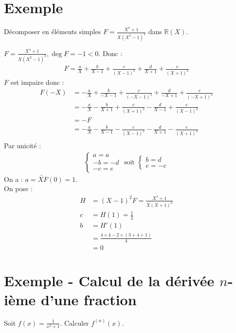 \documentclass[../main.tex]{subfiles}
\begin{document}
\section{Exemple}
\begin{tcolorbox}[title=Exemple 17.47, title filled=false, colframe=darkgreen, colback=darkgreen!10!white]
    Décomposer en éléments simples $F = \frac{X^4 + 1}{X(X^2 - 1)^2}$ dans $\mathbb{R}(X)$. 
\end{tcolorbox}
\noindent $F = \frac{X^4 + 1}{X(X^2 - 1)^2}, \deg F = -1 < 0$. Donc :\\
\begin{align*}
    F = \frac{a}{X} + \frac{b}{X - 1} + \frac{c}{(X - 1)^2} + \frac{d}{X + 1} + \frac{e}{(X + 1)^2}
\end{align*}
$F$ est impaire donc : 
\begin{align*}
    F(-X) &= -\frac{a}{X} + \frac{b}{-X-1} + \frac{c}{(-X - 1)^2} + \frac{d}{-X + 1} + \frac{e}{(-X + 1)^2} \\
    &= -\frac{a}{X} - \frac{b}{X + 1} + \frac{c}{(X + 1)^2} - \frac{d}{X - 1} + \frac{e}{(X - 1)^2} \\
    &= -F \\
    &= -\frac{a}{X} - \frac{b}{X - 1} - \frac{c}{(X - 1)^2} - \frac{d}{X + 1} - \frac{e}{(X + 1)^2} \\
\end{align*}
Par unicité : 
\begin{align*}
    \begin{cases}
        a = a \\
        -b = -d \\
        -c = e
    \end{cases}
    \text{ soit }
    \begin{cases}
        b = d \\
        e = -c
    \end{cases}
\end{align*}
On a : $a = \tilde{XF}(0) = 1$. \\
On pose : 
\begin{align*}
    H &= (X - 1)^2 F = \frac{X^4 + 1}{X(X + 1)^2} \\
    c &= H(1) = \frac{1}{2} \\
    b &= H'(1) \\
    &= \frac{4 \times 4 - 2 \times (3 + 4 + 1)}{4} \\
    &= 0
\end{align*}

\section{Exemple - Calcul de la dérivée $n$-ième d'une fraction}
\begin{tcolorbox}[title=Exemple 17.51, title filled=false, colframe=darkgreen, colback=darkgreen!10!white]
    Soit $f(x) = \frac{1}{x^2 + 1}$. Calculer $f^{(n)}(x)$. 
\end{tcolorbox}
\end{document}
